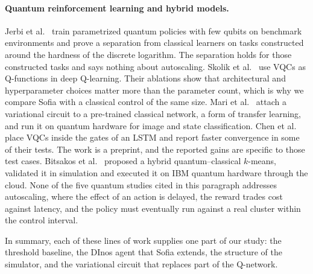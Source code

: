 \paragraph{Quantum reinforcement learning and hybrid models.}
Jerbi et al.~\cite{jerbi2021parametrized} train parametrized quantum policies with few qubits on benchmark
environments and prove a separation from classical learners on tasks constructed around the hardness of the
discrete logarithm. The separation holds for those constructed tasks and says nothing about autoscaling.
Skolik et al.~\cite{skolik2022quantum} use VQCs as Q-functions in deep Q-learning. Their ablations show that
architectural and hyperparameter choices matter more than the parameter count, which is why we compare Sofia with
a classical control of the same size. Mari et al.~\cite{mari2020transfer} attach a variational circuit to a
pre-trained classical network, a form of transfer learning, and run it on quantum hardware for image and state
classification. Chen et al.~\cite{chen2020qlstm} place VQCs inside
the gates of an LSTM and report faster convergence in some of their tests. The work is a preprint, and the reported gains are specific
to those test cases. Bitsakos et al.~\cite{bitsakos2025quantuml} proposed a hybrid
quantum--classical $k$-means, validated it in simulation and executed it on IBM quantum hardware through the cloud. None of the five quantum studies cited in this paragraph
addresses autoscaling, where the effect of an action is delayed, the reward trades cost against latency, and the policy must eventually run against a real
cluster within the control interval.

In summary, each of these lines of work supplies one part of our study: the threshold baseline, the DInos agent
that Sofia extends, the structure of the simulator, and the variational circuit that replaces part of the
Q-network.

